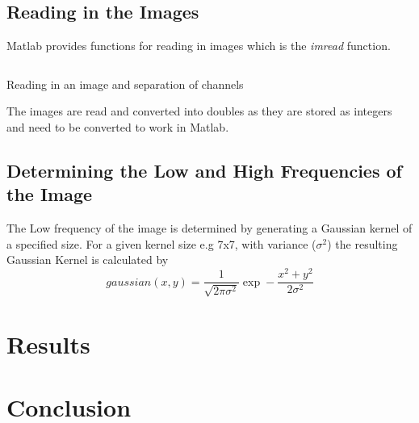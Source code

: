\documentclass[a4paper,12pt]{article}
\begin{document}
	\subsection{Reading in the Images}
	Matlab provides functions for reading in images which is the \textit{imread} function. 
	\begin{listing}[htbp!]
		\inputminted[breaklines=true,breakautoindent=true,firstline=9,lastline=14]{matlab}{minty_matlab.m}
		\caption{Reading in an image and separation of channels}
		\label{code:algebraic} 
	\end{listing}
	The images are read and converted into doubles as they are stored as integers and need to be converted to work in Matlab.
	
	\subsection{Determining the Low and High Frequencies of the Image}
	The Low frequency of the image is determined by generating a Gaussian kernel of a specified size. For a given kernel size e.g 7x7, with variance ($\sigma^2$) the resulting Gaussian Kernel is calculated by 
		\begin{equation}
			gaussian(x,y) = \frac{1}{\sqrt{2\pi\sigma^2}}\exp-\frac{x^2 + y^2}{2\sigma^2}
		\end{equation} 
	
\section{Results}
\section{Conclusion}
\end{document}
